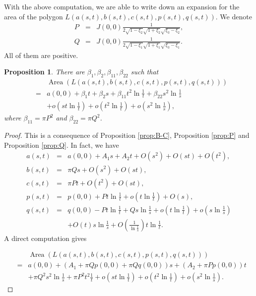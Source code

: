 \documentclass[11pt]{amsart}
\theoremstyle{plain}
\newtheorem{Proposition}[Theorem]{Proposition}
\begin{document}
With the above computation, we are able to write down an expansion
 for the area of the polygon $L(a(s,t),b(s,t),c(s,t),p(s,t),q(s,t))$.
 We denote 
 \begin{eqnarray*}
P &=& J(0,0)\frac{1}{2\sqrt{1-\xi_2}\sqrt{1+\xi_2}\sqrt{\xi_3-\xi_2}}, \\
   Q &=& J(0,0) \frac{1}{2\sqrt{1-\xi_1}\sqrt{1+\xi_1}\sqrt{\xi_3-\xi_1}}. 
 \end{eqnarray*}
All of them are positive. 
\begin{Proposition}\label{prop:area}
    There are $\beta_1,\beta_2, \beta_{11}, \beta_{22}$ such that 
 \begin{eqnarray*}
   && \operatorname{Area}(L(a(s,t),b(s,t),c(s,t),p(s,t),q(s,t))) \\
    &=& a(0,0)+\beta_1t+\beta_2s
    +\beta_{11}t^2\ln \frac{1}{t}+\beta_{22}s^2\ln \frac{1}{s}\\
    && +o(st\ln \frac{1}{t})+o(t^2\ln \frac{1}{t}) +o(s^2\ln \frac{1}{s}),
\end{eqnarray*} 
where  $\beta_{11}=\pi P^2$ and $\beta_{22}=\pi Q^2$.
\end{Proposition}
\begin{proof}
This is a consequence of Proposition \ref{prop:B-C}, Proposition \ref{prop:P} and 
Proposition \ref{prop:Q}. In fact, we have 
\begin{eqnarray*}
a(s,t) &=& a(0,0) + A_1s+ A_2t + O(s^2)+O(st)+O(t^2), \\
  b(s,t) &=& \pi Q s+O(s^2)+O(st), \\
  c(s,t) &=& \pi P t+O(t^2)+O(st), \\
  p(s,t)&=&p(0,0)+ P t\ln \frac{1}{t}+o(t\ln \frac{1}{t})+O(s),\\
  q(s,t)&=& q(0,0)-Pt\ln \frac{1}{t}+Qs\ln \frac{1}{s}+o(t\ln \frac{1}{t})+o(s\ln \frac{1}{s}) \\
  && + O(t) s \ln \frac{1}{s} + O\left(\frac{1}{\ln \frac{1}{s}}\right) t \ln \frac{1}{t}.
\end{eqnarray*}
A direct computation gives 

\begin{eqnarray*}
   && \operatorname{Area}(L(a(s,t),b(s,t),c(s,t),p(s,t),q(s,t))) \\
   &=& a(0,0)+\left(A_1+\pi Q p(0,0)+\pi Q q(0,0)\right)s + \left(A_2+\pi P p(0,0)\right)t \\
   &&%
   + \pi Q^2 s^2\ln\frac{1}{s}+\pi P^2 t^2 \frac{1}{t} 
   + o(st\ln \frac{1}{t})+o(t^2\ln \frac{1}{t}) +o(s^2\ln \frac{1}{s}).
\end{eqnarray*}
\end{proof}
 
\end{document}
